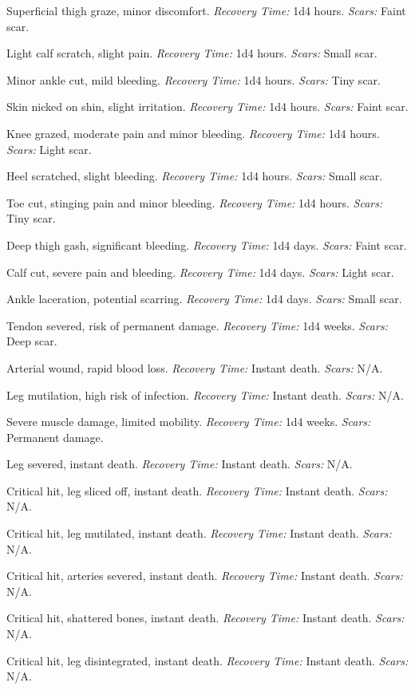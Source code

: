 \begin{description}[labelwidth=1.5em, leftmargin=*, itemsep=0.4em]
    \item[1 -] Superficial thigh graze, minor discomfort. \textit{Recovery Time:} 1d4 hours. \textit{Scars:} Faint scar.
    \item[2 -] Light calf scratch, slight pain. \textit{Recovery Time:} 1d4 hours. \textit{Scars:} Small scar.
    \item[3 -] Minor ankle cut, mild bleeding. \textit{Recovery Time:} 1d4 hours. \textit{Scars:} Tiny scar.
    \item[4 -] Skin nicked on shin, slight irritation. \textit{Recovery Time:} 1d4 hours. \textit{Scars:} Faint scar.
    \item[5 -] Knee grazed, moderate pain and minor bleeding. \textit{Recovery Time:} 1d4 hours. \textit{Scars:} Light scar.
    \item[6 -] Heel scratched, slight bleeding. \textit{Recovery Time:} 1d4 hours. \textit{Scars:} Small scar.
    \item[7 -] Toe cut, stinging pain and minor bleeding. \textit{Recovery Time:} 1d4 hours. \textit{Scars:} Tiny scar.
    \item[8 -] Deep thigh gash, significant bleeding. \textit{Recovery Time:} 1d4 days. \textit{Scars:} Faint scar.
    \item[9 -] Calf cut, severe pain and bleeding. \textit{Recovery Time:} 1d4 days. \textit{Scars:} Light scar.
    \item[10 -] Ankle laceration, potential scarring. \textit{Recovery Time:} 1d4 days. \textit{Scars:} Small scar.
    \item[11 -] Tendon severed, risk of permanent damage. \textit{Recovery Time:} 1d4 weeks. \textit{Scars:} Deep scar.
    \item[12 -] Arterial wound, rapid blood loss. \textit{Recovery Time:} Instant death. \textit{Scars:} N/A.
    \item[13 -] Leg mutilation, high risk of infection. \textit{Recovery Time:} Instant death. \textit{Scars:} N/A.
    \item[14 -] Severe muscle damage, limited mobility. \textit{Recovery Time:} 1d4 weeks. \textit{Scars:} Permanent damage.
    \item[15 -] Leg severed, instant death. \textit{Recovery Time:} Instant death. \textit{Scars:} N/A.
    \item[16 -] Critical hit, leg sliced off, instant death. \textit{Recovery Time:} Instant death. \textit{Scars:} N/A.
    \item[17 -] Critical hit, leg mutilated, instant death. \textit{Recovery Time:} Instant death. \textit{Scars:} N/A.
    \item[18 -] Critical hit, arteries severed, instant death. \textit{Recovery Time:} Instant death. \textit{Scars:} N/A.
    \item[19 -] Critical hit, shattered bones, instant death. \textit{Recovery Time:} Instant death. \textit{Scars:} N/A.
    \item[20 -] Critical hit, leg disintegrated, instant death. \textit{Recovery Time:} Instant death. \textit{Scars:} N/A.
\end{description}

